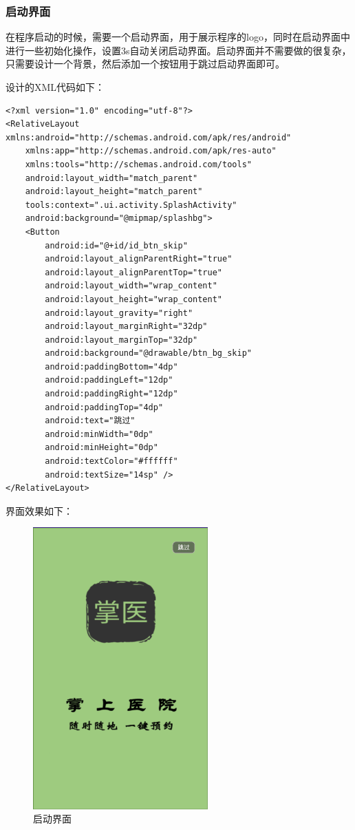 \documentclass[UTF8,12pt]{article}
\begin{document}
\newpage

\subsubsection{启动界面}
在程序启动的时候，需要一个启动界面，用于展示程序的logo，同时在启动界面中进行一些初始化操作，设置3s自动关闭启动界面。启动界面并不需要做的很复杂，只需要设计一个背景，然后添加一个按钮用于跳过启动界面即可。

设计的XML代码如下：

\begin{lstlisting}
<?xml version="1.0" encoding="utf-8"?>
<RelativeLayout xmlns:android="http://schemas.android.com/apk/res/android"
    xmlns:app="http://schemas.android.com/apk/res-auto"
    xmlns:tools="http://schemas.android.com/tools"
    android:layout_width="match_parent"
    android:layout_height="match_parent"
    tools:context=".ui.activity.SplashActivity"
    android:background="@mipmap/splashbg">
    <Button
        android:id="@+id/id_btn_skip"
        android:layout_alignParentRight="true"
        android:layout_alignParentTop="true"
        android:layout_width="wrap_content"
        android:layout_height="wrap_content"
        android:layout_gravity="right"
        android:layout_marginRight="32dp"
        android:layout_marginTop="32dp"
        android:background="@drawable/btn_bg_skip"
        android:paddingBottom="4dp"
        android:paddingLeft="12dp"
        android:paddingRight="12dp"
        android:paddingTop="4dp"
        android:text="跳过"
        android:minWidth="0dp"
        android:minHeight="0dp"
        android:textColor="#ffffff"
        android:textSize="14sp" />
</RelativeLayout>
\end{lstlisting}

\newpage

界面效果如下：

\begin{figure}[htbp]
    \centering
    \includegraphics[width=0.6\textwidth]{imgs/10.png}
    \caption{启动界面}
\end{figure}
\end{document}

